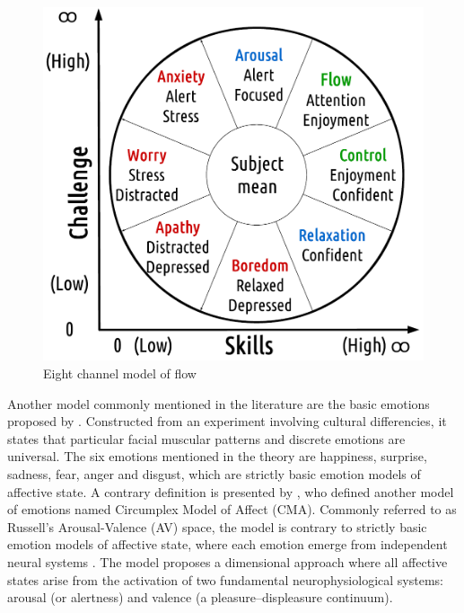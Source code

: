 \begin{figure}[h!]
    \centering
    \includegraphics[scale=0.3]{figures/flow-eight.png}
    \caption{Eight channel model of flow \parencite{nakamura2014concept}}
    \label{fig:flow-eight}
\end{figure}

Another model commonly mentioned in the literature are the basic emotions proposed by \textcite{ekman1971constants}. Constructed from an experiment involving cultural differencies, it states that particular facial muscular patterns and discrete emotions are universal. The six emotions mentioned in the theory are happiness, surprise, sadness, fear, anger and disgust, which are strictly basic emotion models of affective state. A contrary definition is presented by \textcite{russell1978evidence}, who defined another model of emotions named Circumplex Model of Affect (CMA). Commonly referred to as Russell's Arousal-Valence (AV) space, the model is contrary to strictly basic emotion models of affective state, where each emotion emerge from independent neural systems \parencite{posner2005circumplex}. The model proposes a dimensional approach where all affective states arise from the activation of two fundamental neurophysiological systems: arousal (or alertness) and valence (a pleasure–displeasure continuum).

